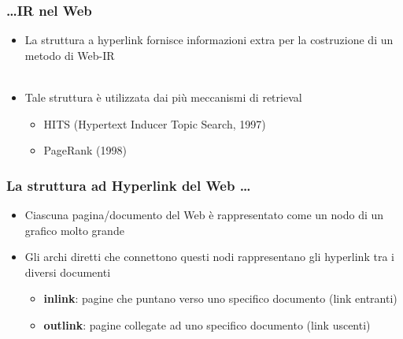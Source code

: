 \documentclass{beamer}
\begin{document}
\begin{frame}
	\frametitle{\dots IR nel Web}
	\begin{itemize}
	\item La struttura a hyperlink fornisce informazioni extra per la costruzione di un metodo di Web-IR \\~\\
	\item Tale struttura è utilizzata dai più meccanismi di retrieval
	\begin{itemize}
		\item HITS (Hypertext Inducer Topic Search, 1997)
		\item PageRank (1998)
	\end{itemize}
\end{itemize}
\end{frame}
\begin{frame}
	\frametitle{La struttura ad Hyperlink del Web \dots}
	\begin{itemize}
		\item Ciascuna pagina/documento del Web è
		rappresentato come un nodo di un grafico
		molto grande
		\item Gli archi diretti che connettono questi nodi rappresentano gli hyperlink tra i diversi documenti
		\begin{itemize}
			\item \textbf{inlink}: pagine che puntano verso uno specifico documento (link entranti)
			\item \textbf{outlink}: pagine collegate ad uno specifico documento (link uscenti)
		\end{itemize}
	\end{itemize}
\end{frame}
\end{document}
